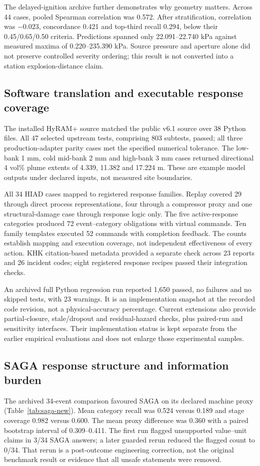 \documentclass[12pt,a4paper]{article}
\begin{document}
The delayed-ignition archive further demonstrates why geometry matters. Across
44 cases, pooled Spearman correlation was 0.572. After stratification, correlation
was $-0.023$, concordance 0.421 and top-third recall 0.294, below their
0.45/0.65/0.50 criteria. Predictions spanned only 22.091--22.740 kPa against
measured maxima of 0.220--235.390 kPa. Source pressure and aperture alone did
not preserve controlled severity ordering; this result is not converted into
a station explosion-distance claim.

\subsection{Software translation and executable response coverage}
The installed HyRAM+ source matched the public v6.1 source over 38 Python files.
All 47 selected upstream tests, comprising 803 subtests, passed; all three
production-adapter parity cases met the specified numerical tolerance. The
low-bank 1 mm, cold mid-bank 2 mm and high-bank 3 mm cases returned directional
4 vol\% plume extents of 4.339, 11.382 and 17.224 m. These are example
model outputs under declared inputs, not measured site boundaries.

All 34 HIAD cases mapped to registered response families. Replay covered 29
through direct process representations, four through a compressor proxy and
one structural-damage case through response logic only. The five
active-response categories produced 72 event--category obligations with virtual
commands. Ten family templates executed 52 commands with completion feedback.
The counts establish mapping and execution coverage, not independent
effectiveness of every action. KHK citation-based metadata provided a separate
check across 23 reports and 26 incident codes; eight registered response
recipes passed their integration checks.

An archived full Python regression run reported 1,650 passed, no failures and
no skipped tests, with 23 warnings. It is an implementation snapshot at the
recorded code revision, not a physical-accuracy percentage. Current extensions
also provide partial-closure, stale/dropout and residual-hazard checks, plus
paired-run and sensitivity interfaces. Their implementation status is kept
separate from the earlier empirical evaluations and does not enlarge those
experimental samples.

\subsection{SAGA response structure and information burden}
The archived 34-event comparison favoured SAGA on its declared machine proxy
(Table~\ref{tab:saga-new}). Mean category recall was 0.524 versus 0.189 and
stage coverage 0.982 versus 0.600. The mean proxy difference was 0.360 with
a paired bootstrap interval of 0.309--0.411. The first run flagged unsupported
value--unit claims in 3/34 SAGA answers; a later guarded rerun reduced the
flagged count to 0/34. That rerun is a post-outcome engineering correction,
not the original benchmark result or evidence that all unsafe statements were
removed.
\end{document}
